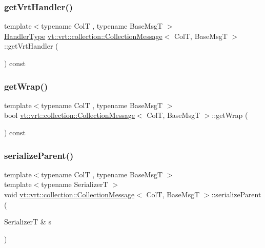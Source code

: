 \subsubsection{\texorpdfstring{get\+Vrt\+Handler()}{getVrtHandler()}}
{\footnotesize\ttfamily template$<$typename ColT , typename Base\+MsgT $>$ \\
\hyperlink{namespacevt_af64846b57dfcaf104da3ef6967917573}{Handler\+Type} \hyperlink{structvt_1_1vrt_1_1collection_1_1_collection_message}{vt\+::vrt\+::collection\+::\+Collection\+Message}$<$ ColT, Base\+MsgT $>$\+::get\+Vrt\+Handler (\begin{DoxyParamCaption}{ }\end{DoxyParamCaption}) const}

\mbox{\label{structvt_1_1vrt_1_1collection_1_1_collection_message_adb0f0904b4bd0646e51dc0a76c54d487}} 
\subsubsection{\texorpdfstring{get\+Wrap()}{getWrap()}}
{\footnotesize\ttfamily template$<$typename ColT , typename Base\+MsgT $>$ \\
bool \hyperlink{structvt_1_1vrt_1_1collection_1_1_collection_message}{vt\+::vrt\+::collection\+::\+Collection\+Message}$<$ ColT, Base\+MsgT $>$\+::get\+Wrap (\begin{DoxyParamCaption}{ }\end{DoxyParamCaption}) const}

\mbox{\label{structvt_1_1vrt_1_1collection_1_1_collection_message_ac6fcdd9d918d5e60d22d92479f47bb92}} 
\subsubsection{\texorpdfstring{serialize\+Parent()}{serializeParent()}}
{\footnotesize\ttfamily template$<$typename ColT , typename Base\+MsgT $>$ \\
template$<$typename SerializerT $>$ \\
void \hyperlink{structvt_1_1vrt_1_1collection_1_1_collection_message}{vt\+::vrt\+::collection\+::\+Collection\+Message}$<$ ColT, Base\+MsgT $>$\+::serialize\+Parent (\begin{DoxyParamCaption}\item[{SerializerT \&}]{s }\end{DoxyParamCaption})}


